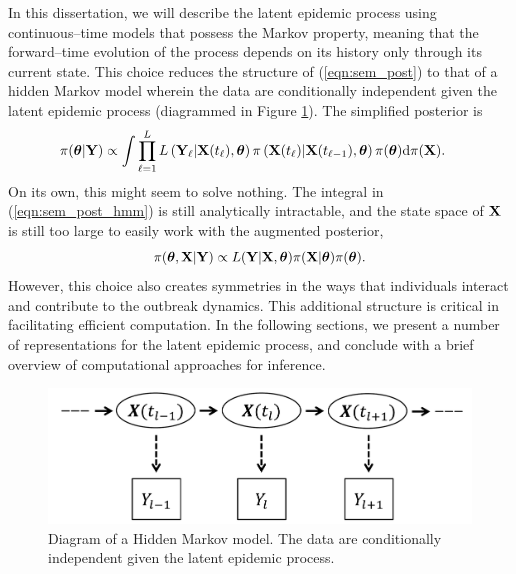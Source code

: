 In this dissertation, we will describe the latent epidemic process using continuous--time models that possess the Markov property, meaning that the forward--time evolution of the process depends on its history only through its current state. This choice reduces the structure of (\ref{eqn:sem_post}) to that of a hidden Markov model wherein the data are conditionally independent given the latent epidemic process (diagrammed in Figure \ref{fig:semhmm}). The simplified posterior is 
\begin{align}
\label{eqn:sem_post_hmm}
\pi(\boldsymbol{\theta}|\mathbf{Y}) &\propto\int \prod_{\ell = 1}^{L} L\left (\mathbf{Y}_\ell|\mathbf{X}(t_{\ell}),\boldsymbol{\theta}\right ) \pi\left (\mathbf{X}(t_\ell)|\mathbf{X}(t_{\ell-1}),\boldsymbol{\theta}\right )\pi(\boldsymbol{\theta})\mathrm{d}\pi(\mathbf{X}).
\end{align}
On its own, this might seem to solve nothing. The integral in (\ref{eqn:sem_post_hmm}) is still analytically intractable, and the state space of $ \mathbf{X} $ is still too large to easily work with the augmented posterior, 
\begin{equation}
\pi(\boldsymbol{\theta},\mathbf{X}|\mathbf{Y})\propto L(\mathbf{Y}|\mathbf{X},\boldsymbol{\theta})\pi(\mathbf{X}|\boldsymbol{\theta})\pi(\boldsymbol{\theta}).
\end{equation}
However, this choice also creates symmetries in the ways that individuals interact and contribute to the outbreak dynamics. This additional structure is critical in facilitating efficient computation. In the following sections, we present a number of representations for the latent epidemic process, and conclude with a brief overview of computational approaches for inference.  

\begin{figure}[htbp]
	\centering
	\includegraphics[width=0.5\linewidth]{figures/SEM_HMM}
	\caption[Diagram of a Hidden Markov model.]{Diagram of a Hidden Markov model. The data are conditionally independent given the latent epidemic process.}
	\label{fig:semhmm}
\end{figure}

